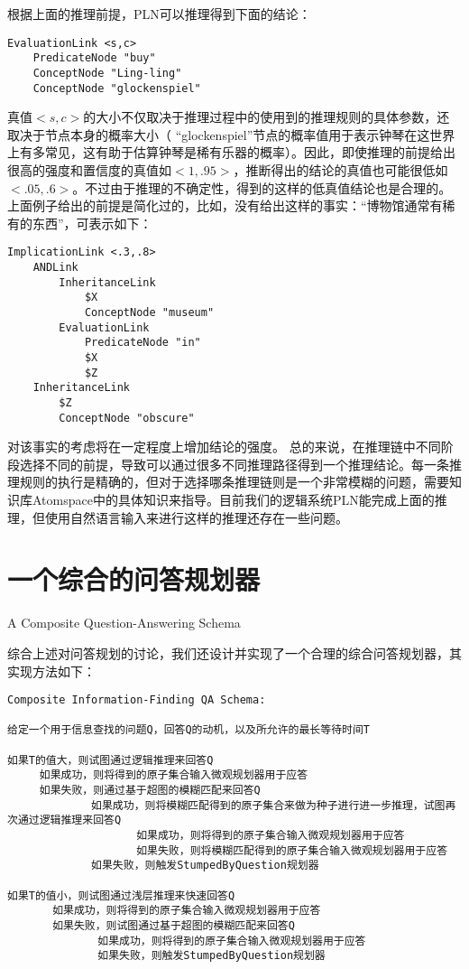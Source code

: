 根据上面的推理前提，PLN可以推理得到下面的结论：

\begin{verbatim}
EvaluationLink <s,c>
	PredicateNode "buy"
	ConceptNode "Ling-ling"
	ConceptNode "glockenspiel"
\end{verbatim}

真值$<s,c>$的大小不仅取决于推理过程中的使用到的推理规则的具体参数，还取决于节点本身的概率大小（ “glockenspiel”节点的概率值用于表示钟琴在这世界上有多常见，这有助于估算钟琴是稀有乐器的概率）。因此，即使推理的前提给出很高的强度和置信度的真值如$<1,.95>$，推断得出的结论的真值也可能很低如$<.05,.6>$。不过由于推理的不确定性，得到的这样的低真值结论也是合理的。
上面例子给出的前提是简化过的，比如，没有给出这样的事实：“博物馆通常有稀有的东西”，可表示如下：

\begin{verbatim}
ImplicationLink <.3,.8>
	ANDLink
		InheritanceLink
			$X
			ConceptNode "museum"
		EvaluationLink
			PredicateNode "in"
			$X
			$Z
	InheritanceLink
		$Z
		ConceptNode "obscure"
\end{verbatim}

对该事实的考虑将在一定程度上增加结论的强度。
总的来说，在推理链中不同阶段选择不同的前提，导致可以通过很多不同推理路径得到一个推理结论。每一条推理规则的执行是精确的，但对于选择哪条推理链则是一个非常模糊的问题，需要知识库Atomspace中的具体知识来指导。目前我们的逻辑系统PLN能完成上面的推理，但使用自然语言输入来进行这样的推理还存在一些问题。


\section{一个综合的问答规划器}{A Composite Question-Answering Schema}

综合上述对问答规划的讨论，我们还设计并实现了一个合理的综合问答规划器，其实现方法如下：

\begin{verbatim}
Composite Information-Finding QA Schema:

给定一个用于信息查找的问题Q，回答Q的动机，以及所允许的最长等待时间T

如果T的值大，则试图通过逻辑推理来回答Q
     如果成功，则将得到的原子集合输入微观规划器用于应答
     如果失败，则通过基于超图的模糊匹配来回答Q
             如果成功，则将模糊匹配得到的原子集合来做为种子进行进一步推理，试图再次通过逻辑推理来回答Q
                    如果成功，则将得到的原子集合输入微观规划器用于应答
                    如果失败，则将模糊匹配得到的原子集合输入微观规划器用于应答
             如果失败，则触发StumpedByQuestion规划器

如果T的值小，则试图通过浅层推理来快速回答Q
       如果成功，则将得到的原子集合输入微观规划器用于应答
       如果失败，则试图通过基于超图的模糊匹配来回答Q
              如果成功，则将得到的原子集合输入微观规划器用于应答
              如果失败，则触发StumpedByQuestion规划器

\end{verbatim}

